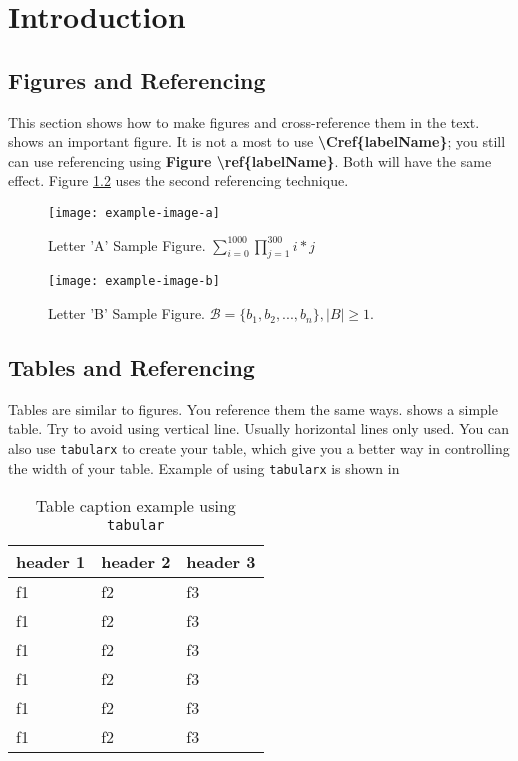 \chapter{Introduction}\label{chapter:introduction}
\section{Figures and Referencing}
This section shows how to make figures and cross-reference them in the text.
 shows an important figure.
It is not a most to use \textbf{\textbackslash Cref\{labelName\}}; you still can use referencing using \textbf{Figure \textbackslash ref\{labelName\}}.
Both will have the same effect.
Figure \ref{fig2} uses the second referencing technique. 

\begin{figure}
	\centering
	\texttt{[image: example-image-a]} 
	\caption{Letter 'A' Sample Figure. $\sum_{i=0}^{1000} \prod_{j=1}^{300} i*j$ }\label{fig1}
\end{figure}

\begin{figure}
	\centering
	\texttt{[image: example-image-b]} 	
	\caption{Letter 'B' Sample Figure. $\mathcal{B}=\{b_1,b_2,...,b_n\}, |B|\ge1$. }\label{fig2}
\end{figure}

\lipsum[1]


\section{Tables and Referencing}
Tables are similar to figures. You reference them the same ways. 
 shows a simple table.
Try to avoid using vertical line. 
Usually horizontal lines only  used.
You can also use \texttt{tabularx} to create your table, which give you a better way in controlling the width of your table. 
Example of using \texttt{tabularx} is shown in 

\begin{table}
	\centering
	\caption{Table caption example using \texttt{tabular}}\label{table1}
\begin{tabular}{lll}
	\toprule
header 1 & header 2 & header 3 \\
\midrule
f1 & f2& f3\\
f1 & f2& f3\\
f1 & f2& f3\\
f1 & f2& f3\\
f1 & f2& f3\\
f1 & f2& f3\\
\bottomrule
\end{tabular}

\end{table}

